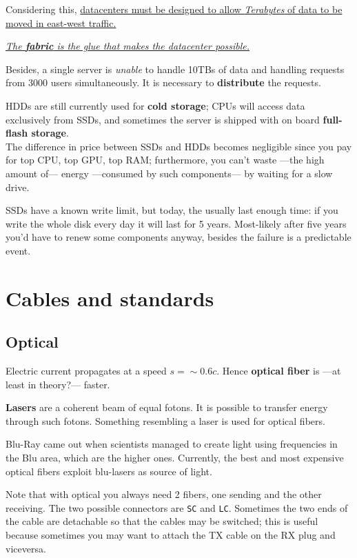Considering this, \ul{datacenters must be designed to allow \textit{Terabytes} of data to be moved in east-west traffic.}

\begin{center}
   \ul{\textit{The \textbf{fabric} is the glue that makes the datacenter possible.}}
\end{center}

Besides, a single server is \textit{unable} to handle 10TBs of data and handling requests from 3000 users simultaneously. It is necessary to \textbf{distribute} the requests.

HDDs are still currently used for \textbf{cold storage};
CPUs will access data exclusively from SSDs, and sometimes the server is shipped with on board \textbf{full-flash storage}.\\
The difference in price between SSDs and HDDs becomes negligible since you pay for top CPU, top GPU, top RAM;
furthermore, you can't waste ---the high amount of--- energy ---consumed by such components--- by waiting for a slow drive.

SSDs have a known write limit, but today, the usually last enough time: if you write the whole disk every day it will last for 5 years. Most-likely after five years you'd have to renew some components anyway, besides the failure is a predictable event.

\section{Cables and standards}
\subsection{Optical}
Electric current propagates at a speed $s = {\sim}0.6c$.
Hence \textbf{optical fiber} is ---at least in theory?--- faster.

\textbf{Lasers} are a coherent beam of equal fotons. It is possible to transfer energy through such fotons. Something resembling a laser is used for optical fibers.

Blu-Ray came out when scientists managed to create light using frequencies in the Blu area, which are the higher ones.
Currently, the best and most expensive optical fibers exploit blu-lasers as source of light.

Note that with optical you always need 2 fibers, one sending and the other receiving. The two possible connectors are \texttt{SC} and \texttt{LC}.
Sometimes the two ends of the cable are detachable so that the cables may be switched; this is useful because sometimes you may want to attach the TX cable on the RX plug and viceversa. 

